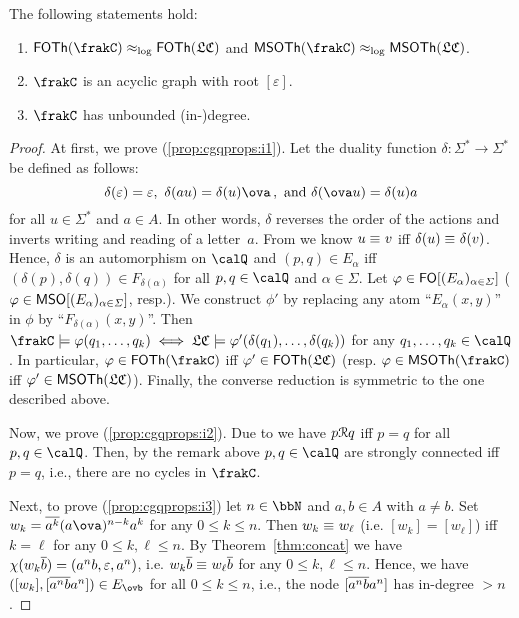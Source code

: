 \begin{proposition}\label{prop:cgqprops}
	The following statements hold:
	\begin{enumerate}[(1)]
		\item $\FOTh{\cQ}\eqlog\FOTh{\lcQ}$ and $\MSOTh{\cQ}\eqlog\MSOTh{\lcQ}$.\label{prop:cgqprops:i1}
		\item $\cQ$ is an acyclic graph with root $[\varepsilon]$.\label{prop:cgqprops:i2}
		\item $\cQ$ has unbounded (in-)degree.\label{prop:cgqprops:i3}
	\end{enumerate}
\end{proposition}
\begin{proof}
	At first, we prove (\ref{prop:cgqprops:i1}). Let the duality function $\delta\colon\varSigma^*\to\varSigma^*$ be defined as follows:
	\[\delta(\varepsilon)=\varepsilon,\ \delta(au)=\delta(u)\ova\,,\text{ and }\delta(\ova u)=\delta(u)a\]
	for all $u\in\varSigma^*$ and $a\in A$. In other words, $\delta$ reverses the order of the actions and inverts writing and reading of a letter~$a$. From \cite[Proposition~3.4]{HusKZ17} we know $u\equiv_{} v$ iff $\delta(u)\equiv_{}\delta(v)$. Hence, $\delta$ is an automorphism on $\Qx$ and $(p,q)\in E_\alpha$ iff $(\delta(p),\delta(q))\in F_{\delta(\alpha)}$ for all $p,q\in\Qx$ and $\alpha\in\varSigma$. Let $\varphi\in\mathsf{FO}[(E_\alpha)_{\alpha\in\varSigma}]$ ($\varphi\in\mathsf{MSO}[(E_\alpha)_{\alpha\in\varSigma}]$, resp.). We construct $\phi'$ by replacing any atom ``$E_\alpha(x,y)$'' in $\phi$ by ``$F_{\delta(\alpha)}(x,y)$''. Then
	$\cQ\models\phi(q_1,\dots,q_k) \iff \lcQ\models\phi'(\delta(q_1),\dots,\delta(q_k))$ for any $q_1,\dots,q_k\in\Qx$. In particular, $\phi\in\FOTh{\cQ}$ iff $\varphi'\in\mathsf{FOTh}(\mathfrak{LC})$ (resp. $\phi\in\MSOTh{\cQ}$ iff $\varphi'\in\mathsf{MSOTh}(\mathfrak{LC})$). Finally, the converse reduction is symmetric to the one described above.
	
	Now, we prove (\ref{prop:cgqprops:i2}). Due to \cite[Corollary~4.7]{HusKZ17} we have $p\mathcal{R} q$ iff $p=q$ for all $p,q\in\Qx$. Then, by the remark above $p,q\in\Qx$ are strongly connected iff $p=q$, i.e., there are no cycles in $\cQ$.
	
	Next, to prove (\ref{prop:cgqprops:i3}) let $n\in\bbN$ and $a,b\in A$ with $a\neq b$. Set $w_k=\ov{a^k}(a\ova)^{n-k}a^k$ for any $0\leq k\leq n$. Then $w_k\equiv_{} w_\ell$ (i.e. $[w_k]=[w_\ell]$) iff $k=\ell$ for any $0\leq k,\ell\leq n$. By Theorem~\ref{thm:concat} we have $\chi(w_k\overline{b})=(a^nb,\varepsilon,a^n)$, i.e. $w_k\overline{b}\equiv_{} w_\ell\overline{b}$ for any $0\leq k,\ell\leq n$. Hence, we have $([w_k],[\ov{a^nb}a^n])\in E_{\ovb}$ for all $0\leq k\leq n$, i.e., the node $[\overline{a^nb}a^n]$ has in-degree $>n$.
\end{proof}


